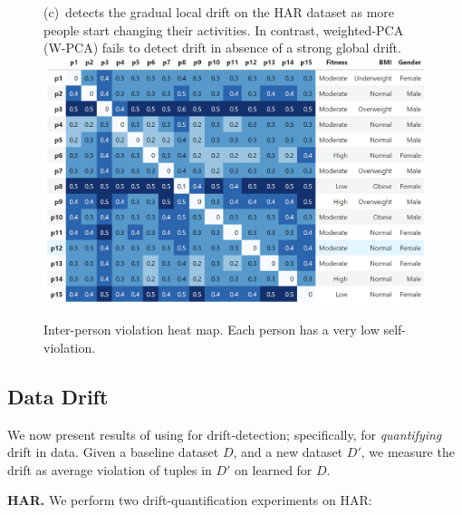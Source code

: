 \begin{figure}[t!]
{%
(c)~\system detects the gradual local drift on the
HAR dataset as more people start changing their
activities. In contrast, weighted-PCA (W-PCA) fails to detect drift in absence of
a strong global drift.} 
		\vspace{2mm}	
	\centering
	\includegraphics[width=1\linewidth]{Figures/Figure_7.png}
		\vspace{-7mm}	
	\caption{ Inter-person \invariant violation heat map. Each person has a very low self-violation.}
	\label{fig:har-inter-person-drift-heatmap}
		\vspace{1mm}	
	\centering
\end{figure}

\smallskip

\subsection{Data Drift}\label{exp-invariants-for-drift}
%
We now present results of using \dis for drift-detection; specifically, for
\emph{quantifying} drift in data. Given a baseline dataset $D$, and a new
dataset $D'$, we measure the drift as average violation of tuples in $D'$ on
\dis learned for $D$.

\smallskip

\noindent\textbf{HAR.} We perform two drift-quantification experiments on
HAR:

\smallskip


